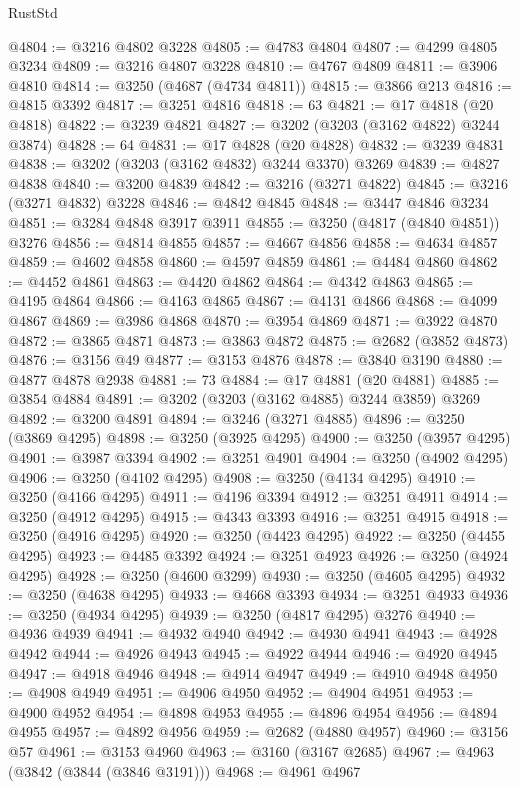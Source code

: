\begin{lexlean}{RustStd}
\begin{coremodule}
@4804 := @3216 @4802 @3228
@4805 := @4783 @4804
@4807 := @4299 @4805 @3234
@4809 := @3216 @4807 @3228
@4810 := @4767 @4809
@4811 := @3906 @4810
@4814 := @3250 (@4687 (@4734 @4811))
@4815 := @3866 @213
@4816 := @4815 @3392
@4817 := @3251 @4816
@4818 := 63
@4821 := @17 @4818 (@20 @4818)
@4822 := @3239 @4821
@4827 := @3202 (@3203 (@3162 @4822) @3244 @3874)
@4828 := 64
@4831 := @17 @4828 (@20 @4828)
@4832 := @3239 @4831
@4838 := @3202 (@3203 (@3162 @4832) @3244 @3370) @3269
@4839 := @4827 @4838
@4840 := @3200 @4839
@4842 := @3216 (@3271 @4822)
@4845 := @3216 (@3271 @4832) @3228
@4846 := @4842 @4845
@4848 := @3447 @4846 @3234
@4851 := @3284 @4848 @3917 @3911
@4855 := @3250 (@4817 (@4840 @4851)) @3276
@4856 := @4814 @4855
@4857 := @4667 @4856
@4858 := @4634 @4857
@4859 := @4602 @4858
@4860 := @4597 @4859
@4861 := @4484 @4860
@4862 := @4452 @4861
@4863 := @4420 @4862
@4864 := @4342 @4863
@4865 := @4195 @4864
@4866 := @4163 @4865
@4867 := @4131 @4866
@4868 := @4099 @4867
@4869 := @3986 @4868
@4870 := @3954 @4869
@4871 := @3922 @4870
@4872 := @3865 @4871
@4873 := @3863 @4872
@4875 := @2682 (@3852 @4873)
@4876 := @3156 @49
@4877 := @3153 @4876
@4878 := @3840 @3190
@4880 := @4877 @4878 @2938
@4881 := 73
@4884 := @17 @4881 (@20 @4881)
@4885 := @3854 @4884
@4891 := @3202 (@3203 (@3162 @4885) @3244 @3859) @3269
@4892 := @3200 @4891
@4894 := @3246 (@3271 @4885)
@4896 := @3250 (@3869 @4295)
@4898 := @3250 (@3925 @4295)
@4900 := @3250 (@3957 @4295)
@4901 := @3987 @3394
@4902 := @3251 @4901
@4904 := @3250 (@4902 @4295)
@4906 := @3250 (@4102 @4295)
@4908 := @3250 (@4134 @4295)
@4910 := @3250 (@4166 @4295)
@4911 := @4196 @3394
@4912 := @3251 @4911
@4914 := @3250 (@4912 @4295)
@4915 := @4343 @3393
@4916 := @3251 @4915
@4918 := @3250 (@4916 @4295)
@4920 := @3250 (@4423 @4295)
@4922 := @3250 (@4455 @4295)
@4923 := @4485 @3392
@4924 := @3251 @4923
@4926 := @3250 (@4924 @4295)
@4928 := @3250 (@4600 @3299)
@4930 := @3250 (@4605 @4295)
@4932 := @3250 (@4638 @4295)
@4933 := @4668 @3393
@4934 := @3251 @4933
@4936 := @3250 (@4934 @4295)
@4939 := @3250 (@4817 @4295) @3276
@4940 := @4936 @4939
@4941 := @4932 @4940
@4942 := @4930 @4941
@4943 := @4928 @4942
@4944 := @4926 @4943
@4945 := @4922 @4944
@4946 := @4920 @4945
@4947 := @4918 @4946
@4948 := @4914 @4947
@4949 := @4910 @4948
@4950 := @4908 @4949
@4951 := @4906 @4950
@4952 := @4904 @4951
@4953 := @4900 @4952
@4954 := @4898 @4953
@4955 := @4896 @4954
@4956 := @4894 @4955
@4957 := @4892 @4956
@4959 := @2682 (@4880 @4957)
@4960 := @3156 @57
@4961 := @3153 @4960
@4963 := @3160 (@3167 @2685)
@4967 := @4963 (@3842 (@3844 (@3846 @3191)))
@4968 := @4961 @4967

\end{coremodule}
\end{lexlean}
